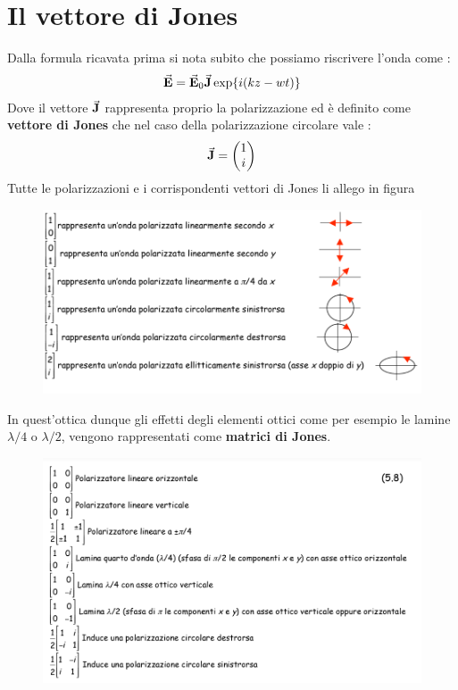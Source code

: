 \section{Il vettore di Jones}
Dalla formula ricavata prima si nota subito che possiamo riscrivere l'onda come :
\begin{align*}
    \va{E} = \va{E}_{0}\va{J}\exp{i(kz-wt)}
\end{align*}
Dove il vettore $\va{J}$ rappresenta proprio la polarizzazione ed è definito come \textbf{vettore di Jones} che nel caso 
della polarizzazione circolare vale : 
\begin{align*}
        \va{J} = \begin{pmatrix} 1 \\ i \end{pmatrix}
\end{align*}
Tutte le polarizzazioni e i corrispondenti vettori di Jones li allego in figura
\begin{figure}[!h]
    \centering
    \includegraphics[scale=0.4]{polarizzazione/VettoriJones}
\end{figure}
In quest'ottica dunque gli effetti degli elementi ottici come per esempio le lamine $\lambda/4$ o $\lambda/2$, vengono 
rappresentati come \textbf{matrici di Jones}.
\newpage
\begin{figure}[!h]
    \centering
    \includegraphics[scale=0.4]{polarizzazione/MatriciJones}
\end{figure}

